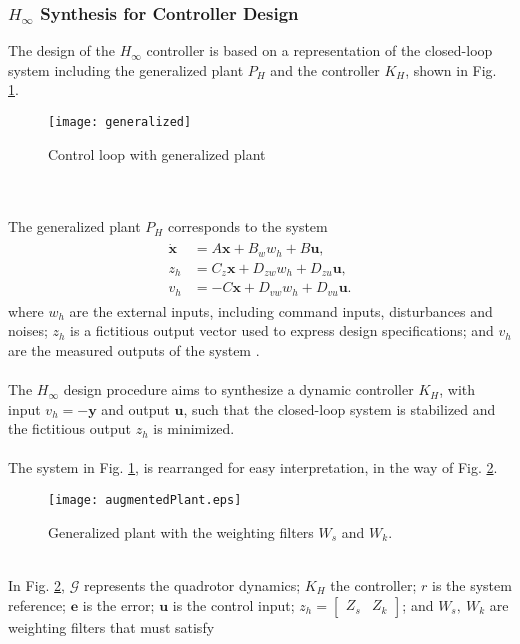 \subsubsection{$H_\infty$ Synthesis for Controller Design}
The design of the $H_\infty$ controller is based on a representation of the closed-loop system including the generalized plant $P_H$ and the controller $K_H$, shown in Fig. \ref{fig:generalized}.
	\begin{figure}[h]
	\begin{center}
	\texttt{[image: generalized]}
	\caption{Control loop with generalized plant}
	\label{fig:generalized}
	\end{center}
	\end{figure}
\\\\The generalized plant $P_H$ corresponds to the system
\begin{align}
\begin{split}
\mathbf{\dot{x}} & = A\mathbf{x} + B_{w}w_{h} + B\mathbf{u},\\[5px]
z_{h} & = C_{z}\mathbf{x} + D_{zw}w_{h} + D_{zu}\mathbf{u},\\[5px]
v_{h} & = -C\mathbf{x} + D_{vw}w_{h} + D_{vu}\mathbf{u}.
\end{split}
\end{align} 
where $w_h$ are the external inputs, including command inputs, disturbances and noises; $z_h$ is a fictitious output vector used to express design specifications; and $v_h$ are the measured outputs of the system \cite{Werner2012}.
\\\\
The $H_\infty$ design procedure aims to synthesize a dynamic controller $K_H$, with input $v_h = -\mathbf{y}$ and output $\mathbf{u}$, such that the closed-loop system is stabilized and the fictitious output $z_h$ is minimized.
\\\\
The system in Fig. \ref{fig:generalized}, is rearranged for easy interpretation, in the way of Fig. \ref{fig:augmentedPlant}.
\begin{figure}[h]
	\begin{center}
	\texttt{[image: augmentedPlant.eps]}
	\caption{Generalized plant with the weighting filters $W_s$ and $W_k$.}
	\label{fig:augmentedPlant}
	\end{center}
	\end{figure}	
\\In Fig. \ref{fig:augmentedPlant}, $\mathcal{G}$ represents the quadrotor dynamics; $K_H$ the controller; $r$ is the system reference; $\mathbf{e}$ is the error; $\mathbf{u}$ is the control input; $z_{h} = \begin{bmatrix}
Z_s & Z_k
\end{bmatrix}$; and $W_{s},\ W_{k}$ are weighting filters that must satisfy 

